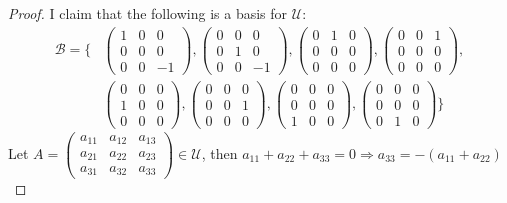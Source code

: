 \documentclass{article}
\begin{document}
\begin{proof}
I claim that the following is a basis for $\mathcal{U}$:
\begin{align*}
\mathcal{B} = \{ &\begin{pmatrix} 1&0&0\\0&0&0\\0&0&-1 \end{pmatrix}, \begin{pmatrix} 0&0&0\\0&1&0\\0&0&-1 \end{pmatrix}, \begin{pmatrix} 0&1&0\\0&0&0\\0&0&0 \end{pmatrix}, \begin{pmatrix} 0&0&1\\0&0&0\\0&0&0 \end{pmatrix}, \\
&\begin{pmatrix} 0&0&0\\1&0&0\\0&0&0 \end{pmatrix}, \begin{pmatrix} 0&0&0\\0&0&1\\0&0&0 \end{pmatrix}, \begin{pmatrix} 0&0&0\\0&0&0\\1&0&0 \end{pmatrix}, \begin{pmatrix} 0&0&0\\0&0&0\\0&1&0 \end{pmatrix} \}
\end{align*}
Let $A= \begin{pmatrix} a_{11}&a_{12}&a_{13} \\a_{21}&a_{22}&a_{23}\\a_{31}&a_{32}&a_{33}\end{pmatrix}  \in \mathcal{U}$, then $a_{11}+a_{22}+a_{33} = 0 \Rightarrow a_{33} = -(a_{11}+a_{22})$


\end{proof}
\end{document}

